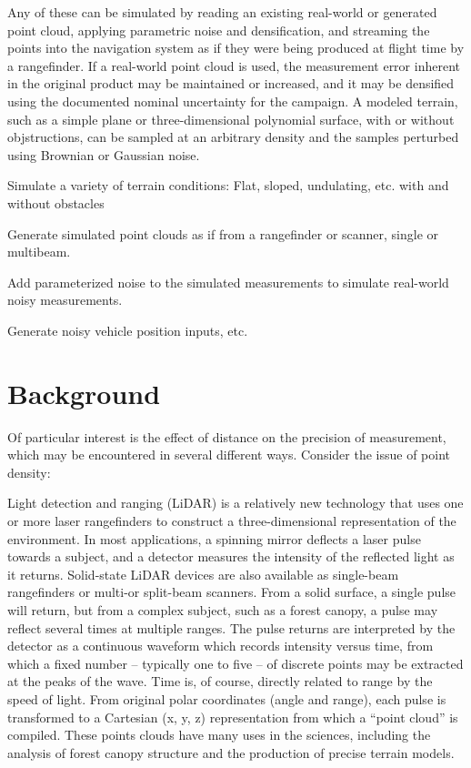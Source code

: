 \documentclass[10pt,a4paper]{report}
\begin{document}
Any of these can be simulated by reading an existing real-world or generated point cloud, applying parametric noise and densification, and streaming the points into the navigation system as if they were being produced at flight time by a rangefinder. If a real-world point cloud is used, the measurement error inherent in the original product may be maintained or increased, and it may be densified using the documented nominal uncertainty for the campaign. A modeled terrain, such as a simple plane or three-dimensional polynomial surface, with or without objstructions, can be sampled at an arbitrary density and the samples perturbed using Brownian or Gaussian noise.

Simulate a variety of terrain conditions: Flat, sloped, undulating, etc. with and without obstacles

Generate simulated point clouds as if from a rangefinder or scanner, single or multibeam.

Add parameterized noise to the simulated measurements to simulate real-world noisy measurements.

Generate noisy vehicle position inputs, etc.


\section{Background}

Of particular interest is the effect of distance on the precision of measurement, which may be encountered in several different ways. Consider the issue of point density:

Light detection and ranging (LiDAR) is a relatively new technology that uses one or more laser rangefinders to construct a three-dimensional representation of the environment. In most applications, a spinning mirror deflects a laser pulse towards a subject, and a detector measures the intensity of the reflected light as it returns. Solid-state LiDAR devices are also available as single-beam rangefinders or multi-or split-beam scanners. From a solid surface, a single pulse will return, but from a complex subject, such as a forest canopy, a pulse may reflect several times at multiple ranges. The pulse returns are interpreted by the detector as a continuous waveform which records intensity versus time, from which a fixed number -- typically one to five -- of discrete points may be extracted at the peaks of the wave. Time is, of course, directly related to range by the speed of light. From original polar coordinates (angle and range), each pulse is transformed to a Cartesian (x, y, z) representation from which a “point cloud” is compiled. These points clouds have many uses in the sciences, including the analysis of forest canopy structure and the production of precise terrain models. 
\end{document}
